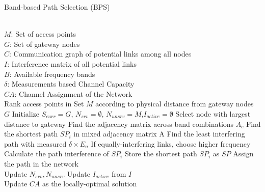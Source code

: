 
\begin{algorithm}[t]
    \small
\caption{Band-based Path Selection (BPS)}
\begin{algorithmic}[1]
\label{algorithms:bps}
\REQUIRE  ~~\\
	$M$: Set of access points\\
	$G$: Set of gateway nodes\\
	$C$: Communication graph of potential links among all nodes\\
	$I$: Interference matrix of all potential links \\
	$B$: Available frequency bands \\
	$\delta$: Measurements based Channel Capacity
\ENSURE ~~\\    
$CA$: Channel Assignment of the Network\\
\STATE Rank access points in Set $M$ according to physical distance from gateway nodes $G$
\STATE Initialize $S_{curr}=G$, $N_{srv}=\emptyset$, $N_{unsrv}=M$,$I_{active}=\emptyset$
\STATE Select node with largest distance to gateway
\STATE Find the adjacency matrix across band combinations $A_c$
\STATE Find the shortest path $SP_i$ in mixed adjacency matrix A 
\STATE Find the least interfering path with measured $\delta \times E_n$
\STATE If equally-interfering links, choose higher frequency
\STATE Calculate the path interference of $SP_i$
\ENDFOR
\STATE Store the shortest path $SP_i$ as $SP$
\ENDFOR
\STATE Assign the path in the network\\
		\STATE Update $N_{srv},N_{unsrv}$
		\STATE Update $I_{active}$ from $I$
\ENDWHILE \\
Update $CA$ as the locally-optimal solution\\
\end{algorithmic}
\end{algorithm}


